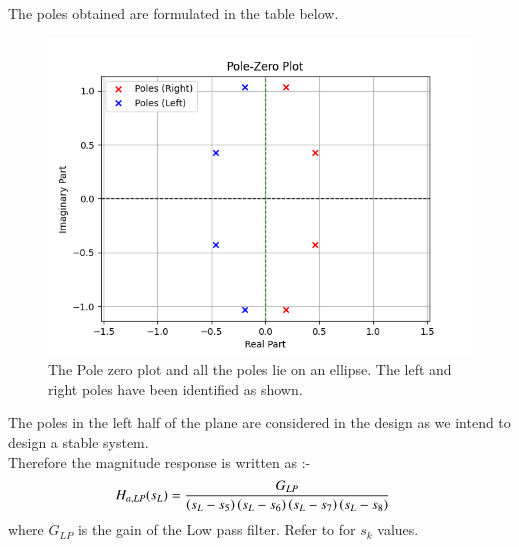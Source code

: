 \documentclass{article}
\begin{document}
\begin{enumerate}
The poles obtained are formulated in the table below.



\begin{figure}[H]
\centering
\includegraphics[width=1\columnwidth]{figs/Pole_Zero_plt.png}
\caption{The Pole zero plot and all the poles lie on an ellipse. The left and right poles have been identified as shown.}
\label{fig:pole_zero_plt}
\end{figure}
The poles in the left half of the plane are considered in the design as we intend to design a stable system.\\
Therefore the magnitude response is written as :- 
\begin{align}
    H_{a,LP}(s_L) &= \frac{G_{LP}}{\left(s_L-s_5\right)\left(s_L-s_6\right)\left(s_L-s_7\right)\left(s_L-s_8\right)}
\end{align}
where $G_{LP}$ is the gain of the Low pass filter. Refer to  for $s_k$ values.\\


\end{enumerate}
\end{document}
